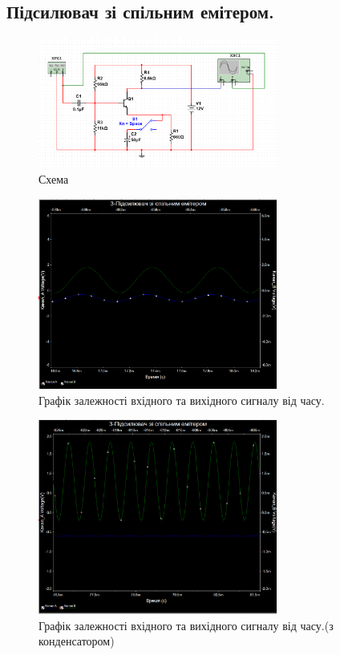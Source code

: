 \documentclass[
  ukrainian,
  14pt
]{extreport}
\begin{document}
\subsection{Підсилювач зі спільним емітером.}
\begin{figure}[H]
  \includegraphics[width=0.7\textwidth]{imgs/3-1.png}
  \centering
  \caption{Схема}
\end{figure}
\begin{figure}[H]
  \includegraphics[width=0.7\textwidth]{imgs/3-2.png}
  \centering
  \caption{Графік залежності вхідного та вихідного сигналу від часу.
  }
\end{figure}
\begin{figure}[H]
  \includegraphics[width=0.7\textwidth]{imgs/3-3.png}
  \centering
  \caption{Графік залежності вхідного та вихідного сигналу від часу.(з конденсатором)
  }
\end{figure}
\end{document}
